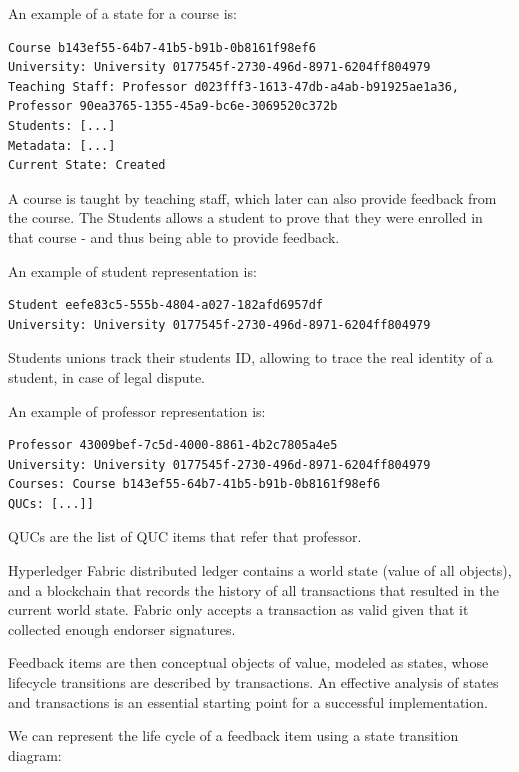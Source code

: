 \documentclass[12pt,a4paper]{article}
\theoremstyle{definition}
\begin{document}
An example of a state for a course is:

\begin{verbatim}
Course b143ef55-64b7-41b5-b91b-0b8161f98ef6
University: University 0177545f-2730-496d-8971-6204ff804979
Teaching Staff: Professor d023fff3-1613-47db-a4ab-b91925ae1a36, Professor 90ea3765-1355-45a9-bc6e-3069520c372b
Students: [...]
Metadata: [...]
Current State: Created
\end{verbatim}

A course is taught by teaching staff, which later can also provide feedback from the course. The Students allows a student to prove that they were enrolled in that course - and thus being able to provide feedback. 

An example of student representation is:
\begin{verbatim}
Student eefe83c5-555b-4804-a027-182afd6957df
University: University 0177545f-2730-496d-8971-6204ff804979

\end{verbatim}

Students unions track their students ID, allowing to trace the real identity of a student, in case of legal dispute.

An example of professor representation is:
\begin{verbatim}
Professor 43009bef-7c5d-4000-8861-4b2c7805a4e5
University: University 0177545f-2730-496d-8971-6204ff804979
Courses: Course b143ef55-64b7-41b5-b91b-0b8161f98ef6
QUCs: [...]]

\end{verbatim}

QUCs are the list of QUC items that refer that professor.


Hyperledger Fabric distributed ledger contains a world state (value of all objects), and a blockchain that records the history of all transactions that resulted in the current world state. Fabric only accepts a transaction as valid given that it collected enough endorser signatures.

Feedback items are then conceptual objects of value, modeled as states, whose lifecycle transitions are described by transactions. An effective analysis of states and transactions is an essential starting point for a successful implementation.

We can represent the life cycle of a feedback item using a state transition diagram:
\end{document}
